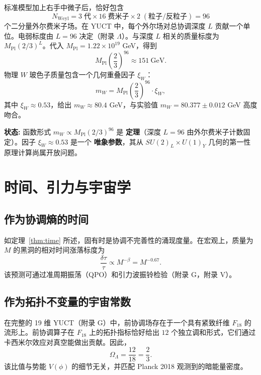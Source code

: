\documentclass[12pt,a4paper]{article}
\begin{document}
	标准模型加上右手中微子后，恰好包含
	\begin{equation}
		N_{\mathrm{Weyl}} = 3\;\text{代} \times 16\;\text{费米子} \times 2\;(\text{粒子/反粒子}) = 96
	\end{equation}
	个二分量外尔费米子场。在 YUCT 中，每个外尔场对总协调深度 \(L\) 贡献一个单位。电弱标度由 \(L = 96\) 决定（附录 \(\Lambda\)）。与深度 \(L\) 相关的质量标度为 \(M_{\mathrm{Pl}} (2/3)^{L}\)。代入 \(M_{\mathrm{Pl}} = 1.22 \times 10^{19}\) GeV，得到
	\begin{equation}
		M_{\mathrm{Pl}} \left(\frac{2}{3}\right)^{96} \approx 151\ \mathrm{GeV}.
	\end{equation}
	物理 \(W\) 玻色子质量包含一个几何重叠因子 \(\xi_W\)：
	\begin{equation}
		m_W = M_{\mathrm{Pl}} \left(\frac{2}{3}\right)^{96} \cdot \xi_W,
		\label{eq:mw}
	\end{equation}
	其中 \(\xi_W \approx 0.53\)，给出 \(m_W \approx 80.4\) GeV，与实验值 \(m_W = 80.377 \pm 0.012\) GeV 高度吻合。
	
	\textbf{状态:} 函数形式 \(m_W \propto M_{\mathrm{Pl}} (2/3)^{96}\) 是 \textbf{定理}（深度 \(L=96\) 由外尔费米子计数固定）。因子 \(\xi_W \approx 0.53\) 是一个 \textbf{唯象参数}，其从 \(SU(2)_L \times U(1)_Y\) 几何的第一性原理计算尚属开放问题。
	
	\section{时间、引力与宇宙学}
	\label{sec:cosmology}
	
	\subsection{作为协调熵的时间}
	
	如定理~\ref{thm:time} 所述，固有时是协调不完善性的涌现度量。在宏观上，质量为 \(M\) 的黑洞的相对时间涨落标度为
	\begin{equation}
		\boxed{\frac{\delta \tau}{\tau} \propto M^{-\beta} = M^{-0.67}}.
	\end{equation}
	该预测可通过准周期振荡（QPO）和引力波振铃检验（附录 G，附录 V）。
	
	\subsection{作为拓扑不变量的宇宙常数}
	
	在完整的 19 维 YUCT（附录 G）中，前协调场存在于一个具有紧致纤维 \(F_{18}\) 的流形上。前协调算子在 \(F_{18}\) 上的拓扑指标恰好给出 \(12\) 个独立调和形式，它们通过卡西米尔效应对真空能做出贡献。因此，
	\begin{equation}
		\boxed{\Omega_\Lambda = \frac{12}{18} = \frac{2}{3}}.
		\label{eq:OmegaLambda}
	\end{equation}
	该比值与势能 \(V(\phi)\) 的细节无关，并匹配 Planck 2018 观测到的暗能量密度。
	
\end{document}
